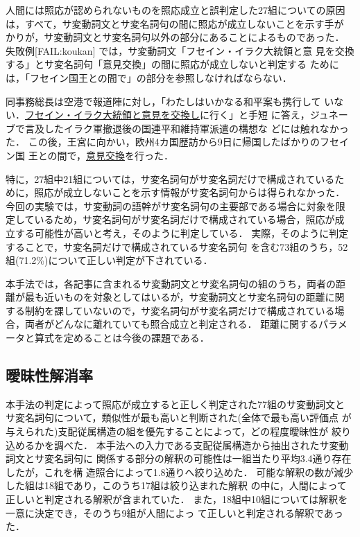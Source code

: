 人間には照応が認められないものを照応成立と誤判定した27組についての原因
は，すべて，サ変動詞文とサ変名詞句の間に照応が成立しないことを示す手が
かりが，サ変動詞文とサ変名詞句以外の部分にあることによるものであった．
失敗例[FAIL:koukan] では，サ変動詞文「フセイン・イラク大統領と意
見を交換する」とサ変名詞句「意見交換」の間に照応が成立しないと判定する
ためには，「フセイン国王との間で」の部分を参照しなければならない． 
\begin{FAIL}
\fail 
同事務総長は空港で報道陣に対し，「わたしはいかなる和平案も携行して
いない．\underline{フセイン・イラク大統領と意見を交換し}に行く」と手短
に答え，ジュネーブで言及したイラク軍撤退後の国連平和維持軍派遣の構想な
どには触れなかった．
この後，王宮に向かい，欧州4カ国歴訪から9日に帰国したばかりのフセイン国
王との間で，\underline{意見交換}を行った．\label{FAIL:koukan}
\end{FAIL}
特に，27組中21組については，サ変名詞句がサ変名詞だけで構成されているた
めに，照応が成立しないことを示す情報がサ変名詞句からは得られなかった．
今回の実験では，サ変動詞の語幹がサ変名詞句の主要部である場合に対象を限
定しているため，サ変名詞句がサ変名詞だけで構成されている場合，照応が成
立する可能性が高いと考え，そのように判定している．
実際，そのように判定することで，サ変名詞だけで構成されているサ変名詞句
を含む73組のうち，52組(71.2\%)について正しい判定が下されている．

本手法では，各記事に含まれるサ変動詞文とサ変名詞句の組のうち，両者の距
離が最も近いものを対象としてはいるが，サ変動詞文とサ変名詞句の距離に関
する制約を課していないので，サ変名詞句がサ変名詞だけで構成されている場
合，両者がどんなに離れていても照合成立と判定される．
距離に関するパラメータと算式を定めることは今後の課題である．

\subsection{曖昧性解消率}

本手法の判定によって照応が成立すると正しく判定された77組のサ変動詞文と
サ変名詞句について，類似性が最も高いと判断された(全体で最も高い評価点
が与えられた)支配従属構造の組を優先することによって，どの程度曖昧性が
絞り込めるかを調べた．
本手法への入力である支配従属構造から抽出されたサ変動詞文とサ変名詞句に
関係する部分の解釈の可能性は一組当たり平均3.4通り存在したが，これを構
造照合によって1.8通りへ絞り込めた．
可能な解釈の数が減少した組は18組であり，このうち17組は絞り込まれた解釈
の中に，人間によって正しいと判定される解釈が含まれていた．
また，18組中10組については解釈を一意に決定でき，そのうち9組が人間によっ
て正しいと判定される解釈であった．

